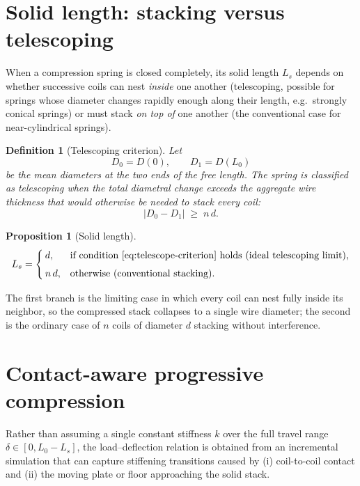 \documentclass[11pt]{article}
\newtheorem{definition}{Definition}
\newtheorem{proposition}{Proposition}
\begin{document}
\section{Solid length: stacking versus telescoping}

When a compression spring is closed completely, its solid length $L_s$
depends on whether successive coils can nest \emph{inside} one another
(telescoping, possible for springs whose diameter changes rapidly enough
along their length, e.g.\ strongly conical springs) or must stack
\emph{on top of} one another (the conventional case for near-cylindrical
springs).

\begin{definition}[Telescoping criterion]
Let
\begin{equation}
D_0 = D(0), \qquad D_1 = D(L_0)
\end{equation}
be the mean diameters at the two ends of the free length. The spring is
classified as telescoping when the total diametral change exceeds the
aggregate wire thickness that would otherwise be needed to stack every
coil:
\begin{equation}
\lvert D_0 - D_1 \rvert \;\ge\; n\,d .
\label{eq:telescope-criterion}
\end{equation}
\end{definition}

\begin{proposition}[Solid length]
\begin{equation}
L_s =
\begin{cases}
d, & \text{if condition \eqref{eq:telescope-criterion} holds
(ideal telescoping limit),}\\[4pt]
n\,d, & \text{otherwise (conventional stacking).}
\end{cases}
\label{eq:solid-length}
\end{equation}
\end{proposition}

The first branch is the limiting case in which every coil can nest fully
inside its neighbor, so the compressed stack collapses to a single wire
diameter; the second is the ordinary case of $n$ coils of diameter $d$
stacking without interference.

\section{Contact-aware progressive compression}

Rather than assuming a single constant stiffness $k$ over the full travel
range $\delta \in [0, L_0 - L_s]$, the load--deflection relation is
obtained from an incremental simulation that can capture stiffening
transitions caused by (i) coil-to-coil contact and (ii) the moving plate
or floor approaching the solid stack.
\end{document}

